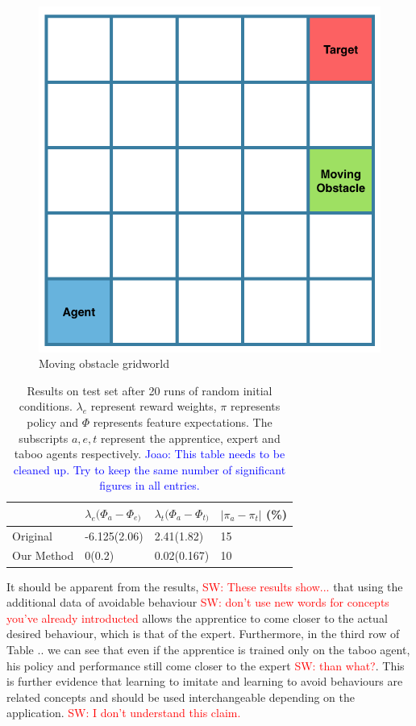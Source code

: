 \documentclass[letterpaper]{article}
\newcommand{\sw}[1]{\textcolor{red}{SW: #1}}
\newcommand{\jm}[1]{\textcolor{blue}{Joao: #1}}
\newcommand{\sw}[1]{}
\newcommand{\jm}[1]{}
\begin{document}
\begin{figure}[t]
  \centering
  \includegraphics[width=0.5\columnwidth]{images/gridworld.png}
  \caption{Moving obstacle gridworld 	\label{fig:gridworld}}
\end{figure}
\begin{table}[]
\centering

\label{tab:results}
\begin{tabular}{|l|l|l|l|}
\hline
           & $\lambda_e(\Phi_{a}-\Phi_{e)}$& $\lambda_t(\Phi_{a}-\Phi_{t)}$ & $|\pi_a - \pi_t|$ (\%) \\ \hline
Original   & -6.125(2.06)        & 2.41(1.82)         & 15                    \\ \hline
Our Method & 0(0.2)              & 0.02(0.167)        & 10                    \\ \hline
\end{tabular}
\caption{Results on test set after 20 runs of random initial conditions. $\lambda_e$ represent reward weights, $\pi$ represents policy and $\Phi$ represents feature expectations. The subscripts $a,e,t$ represent the apprentice, expert and taboo agents respectively. \jm{This table needs to be cleaned up. Try to keep the same number of significant figures in all entries.}}
\end{table}
It should be apparent from the results, \sw{These results show...} that using the additional data of avoidable behaviour \sw{don't use new words for concepts you've already introducted} allows the apprentice to 
come closer to the actual desired behaviour, which is that of the expert. Furthermore, in the third row of Table .. we can see that
even if the apprentice is trained only on the taboo agent, his policy and performance still come closer to the expert \sw{than what?}. This is further
evidence that learning to imitate and learning to avoid behaviours are related concepts and should be used interchangeable depending on the application. \sw{I don't understand this claim.}
\end{document}
